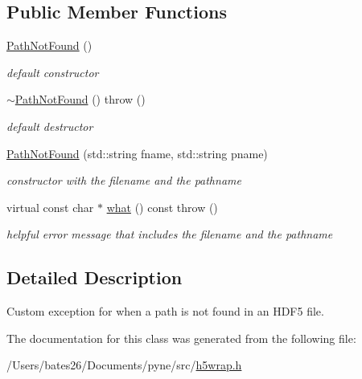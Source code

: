 \subsection*{Public Member Functions}
\begin{DoxyCompactItemize}
\item 
\hypertarget{classh5wrap_1_1_path_not_found_a7b05229fb4f02920732f22622af1f08e}{\hyperlink{classh5wrap_1_1_path_not_found_a7b05229fb4f02920732f22622af1f08e}{Path\+Not\+Found} ()}\label{classh5wrap_1_1_path_not_found_a7b05229fb4f02920732f22622af1f08e}

\begin{DoxyCompactList}\small\item\em default constructor \end{DoxyCompactList}\item 
\hypertarget{classh5wrap_1_1_path_not_found_acf9696ccdfb4a4c63454dbfc1dcde060}{\hyperlink{classh5wrap_1_1_path_not_found_acf9696ccdfb4a4c63454dbfc1dcde060}{$\sim$\+Path\+Not\+Found} ()  throw ()}\label{classh5wrap_1_1_path_not_found_acf9696ccdfb4a4c63454dbfc1dcde060}

\begin{DoxyCompactList}\small\item\em default destructor \end{DoxyCompactList}\item 
\hypertarget{classh5wrap_1_1_path_not_found_aaedd26703acced17206eb8dabd4c5274}{\hyperlink{classh5wrap_1_1_path_not_found_aaedd26703acced17206eb8dabd4c5274}{Path\+Not\+Found} (std\+::string fname, std\+::string pname)}\label{classh5wrap_1_1_path_not_found_aaedd26703acced17206eb8dabd4c5274}

\begin{DoxyCompactList}\small\item\em constructor with the filename and the pathname \end{DoxyCompactList}\item 
\hypertarget{classh5wrap_1_1_path_not_found_ad454d14e0f9f44f4357a5c33a7017b88}{virtual const char $\ast$ \hyperlink{classh5wrap_1_1_path_not_found_ad454d14e0f9f44f4357a5c33a7017b88}{what} () const   throw ()}\label{classh5wrap_1_1_path_not_found_ad454d14e0f9f44f4357a5c33a7017b88}

\begin{DoxyCompactList}\small\item\em helpful error message that includes the filename and the pathname \end{DoxyCompactList}\end{DoxyCompactItemize}


\subsection{Detailed Description}
Custom exception for when a path is not found in an H\+D\+F5 file. 

The documentation for this class was generated from the following file\+:\begin{DoxyCompactItemize}
\item 
/\+Users/bates26/\+Documents/pyne/src/\hyperlink{h5wrap_8h}{h5wrap.\+h}\end{DoxyCompactItemize}
